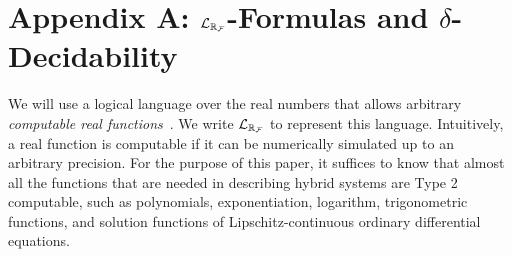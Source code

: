 \newpage
\section*{Appendix A: $\mathcal{L}_{\mathbb{R}_{\mathcal{F}}}$-Formulas and $\delta$-Decidability}

We will use a logical language over the real numbers that allows arbitrary {\em computable real functions}~\cite{CAbook}. We write $\mathcal{L}_{\mathbb{R}_{\mathcal{F}}}$ to represent this language. Intuitively, a real function is computable if it can be numerically simulated up to an arbitrary precision. For the purpose of this paper, it suffices to know that almost all the functions that are needed in describing hybrid systems are Type 2 computable, such as polynomials, exponentiation, logarithm, trigonometric functions, and solution functions of Lipschitz-continuous ordinary differential equations.

